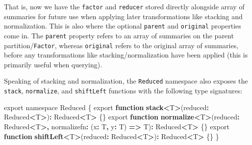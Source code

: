 \documentclass[
  openany]{book}
\newenvironment{Shaded}{\begin{snugshade}}{\end{snugshade}}
\newcommand{\DataTypeTok}[1]{\textcolor[rgb]{0.13,0.29,0.53}{#1}}
\newcommand{\FunctionTok}[1]{\textcolor[rgb]{0.13,0.29,0.53}{\textbf{#1}}}
\newcommand{\ImportTok}[1]{#1}
\newcommand{\KeywordTok}[1]{\textcolor[rgb]{0.13,0.29,0.53}{\textbf{#1}}}
\newcommand{\NormalTok}[1]{#1}
\newcommand{\OperatorTok}[1]{\textcolor[rgb]{0.81,0.36,0.00}{\textbf{#1}}}
\theoremstyle{definition}
\theoremstyle{definition}
\theoremstyle{definition}
\theoremstyle{definition}
\theoremstyle{remark}
\begin{document}
That is, now we have the \texttt{factor} and \texttt{reducer} stored directly alongside array of summaries for future use when applying later transformations like stacking and normalization. This is also where the optional \texttt{parent} and \texttt{original} properties come in. The \texttt{parent} property refers to an array of summaries on the parent partition/\texttt{Factor}, whereas \texttt{original} refers to the original array of summaries, before any transformations like stacking/normalization have been applied (this is primarily useful when querying).

Speaking of stacking and normalization, the \texttt{Reduced} namespace also exposes the \texttt{stack}, \texttt{normalize}, and \texttt{shiftLeft} functions with the following type signatures:

\begin{Shaded}
\begin{Highlighting}[]
\ImportTok{export} \ImportTok{namespace} \DataTypeTok{Reduced}\NormalTok{ \{}
  \ImportTok{export} \KeywordTok{function} \FunctionTok{stack}\OperatorTok{\textless{}}\NormalTok{T}\OperatorTok{\textgreater{}}\NormalTok{(reduced}\OperatorTok{:}\NormalTok{ Reduced}\OperatorTok{\textless{}}\NormalTok{T}\OperatorTok{\textgreater{}}\NormalTok{)}\OperatorTok{:}\NormalTok{ Reduced}\OperatorTok{\textless{}}\NormalTok{T}\OperatorTok{\textgreater{}}\NormalTok{ \{\}}
  \ImportTok{export} \KeywordTok{function} \FunctionTok{normalize}\OperatorTok{\textless{}}\NormalTok{T}\OperatorTok{\textgreater{}}\NormalTok{(reduced}\OperatorTok{:}\NormalTok{ Reduced}\OperatorTok{\textless{}}\NormalTok{T}\OperatorTok{\textgreater{},} 
\NormalTok{                               normalizefn}\OperatorTok{:}\NormalTok{ (x}\OperatorTok{:}\NormalTok{ T}\OperatorTok{,}\NormalTok{ y}\OperatorTok{:}\NormalTok{ T) }\KeywordTok{=\textgreater{}}\NormalTok{ T)}\OperatorTok{:} 
\NormalTok{                                  Reduced}\OperatorTok{\textless{}}\NormalTok{T}\OperatorTok{\textgreater{}}\NormalTok{ \{\}}
  \ImportTok{export} \KeywordTok{function} \FunctionTok{shiftLeft}\OperatorTok{\textless{}}\NormalTok{T}\OperatorTok{\textgreater{}}\NormalTok{(reduced}\OperatorTok{:}\NormalTok{ Reduced}\OperatorTok{\textless{}}\NormalTok{T}\OperatorTok{\textgreater{}}\NormalTok{)}\OperatorTok{:}\NormalTok{ Reduced}\OperatorTok{\textless{}}\NormalTok{T}\OperatorTok{\textgreater{}}\NormalTok{ \{\}}
\NormalTok{\}}
\end{Highlighting}
\end{Shaded}
\end{document}
